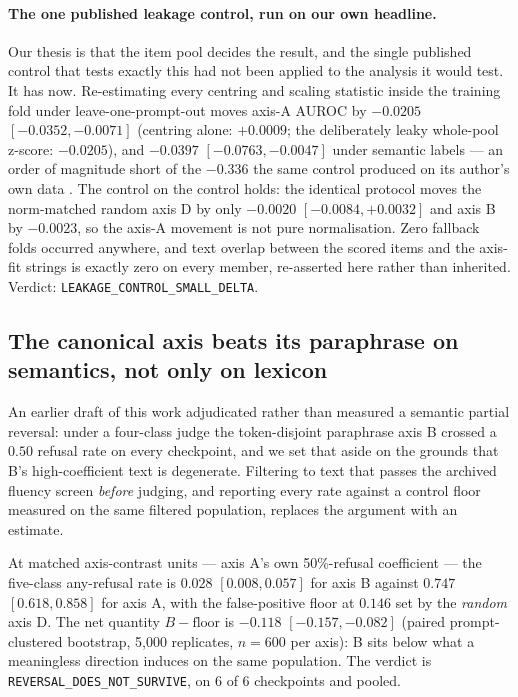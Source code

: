 \documentclass[11pt,letterpaper]{article}
\begin{document}
\paragraph{The one published leakage control, run on our own headline.} Our thesis is that the item pool decides the result, and the single published control that tests exactly this had not been applied to the analysis it would test. It has now. Re-estimating every centring and scaling statistic inside the training fold under leave-one-prompt-out moves axis-A AUROC by $-0.0205$ $[-0.0352, -0.0071]$ (centring alone: $+0.0009$; the deliberately leaky whole-pool z-score: $-0.0205$), and $-0.0397$ $[-0.0763, -0.0047]$ under semantic labels --- an order of magnitude short of the $-0.336$ the same control produced on its author's own data \citep{Mehta2026}. The control on the control holds: the identical protocol moves the norm-matched random axis D by only $-0.0020$ $[-0.0084, +0.0032]$ and axis B by $-0.0023$, so the axis-A movement is not pure normalisation. Zero fallback folds occurred anywhere, and text overlap between the scored items and the axis-fit strings is exactly zero on every member, re-asserted here rather than inherited. Verdict: \texttt{LEAKAGE\_CONTROL\_SMALL\_DELTA}.

\subsection{The canonical axis beats its paraphrase on semantics, not only on lexicon}
\label{sec:degeneracy}

An earlier draft of this work adjudicated rather than measured a semantic partial reversal: under a four-class judge the token-disjoint paraphrase axis B crossed a $0.50$ refusal rate on every checkpoint, and we set that aside on the grounds that B's high-coefficient text is degenerate. Filtering to text that passes the archived fluency screen \emph{before} judging, and reporting every rate against a control floor measured on the same filtered population, replaces the argument with an estimate.

At matched axis-contrast units --- axis A's own 50\%-refusal coefficient --- the five-class any-refusal rate is $0.028$ $[0.008, 0.057]$ for axis B against $0.747$ $[0.618, 0.858]$ for axis A, with the false-positive floor at $0.146$ set by the \emph{random} axis D. The net quantity $B - \text{floor}$ is $-0.118$ $[-0.157, -0.082]$ (paired prompt-clustered bootstrap, 5,000 replicates, $n = 600$ per axis): B sits below what a meaningless direction induces on the same population. The verdict is \texttt{REVERSAL\_\allowbreak DOES\_\allowbreak NOT\_\allowbreak SURVIVE}, on 6 of 6 checkpoints and pooled.
\end{document}
